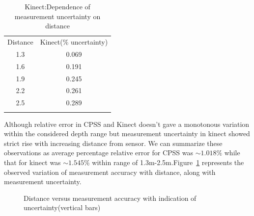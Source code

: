 \begin{table}[ht]
\centering
\begin{tabular}{c c }
\hline\noalign{\smallskip}
Distance   & Kinect(\% uncertainty) \\
\noalign{\smallskip}\hline\noalign{\smallskip}
1.3    & 0.069 \\
1.6    & 0.191 \\
1.9    & 0.245 \\
2.2    & 0.261 \\
2.5    & 0.289 \\
\noalign{\smallskip}\hline
\end{tabular}
\caption{Kinect:Dependence of measurement uncertainty on distance}
\end{table}

\noindent
Although relative error in CPSS and Kinect doesn't gave a monotonous variation within the considered depth range but measurement uncertainty in kinect showed strict rise with increasing  distance from sensor. We can summarize these observations as average percentage relative error for CPSS was $\sim1.018\%$ while that for kinect was $\sim1.545\%$ within range of 1.3m-2.5m.Figure~\ref{fig:dist_vs_accuracy} represents the observed variation of measurement accuracy with distance, along with measurement uncertainty.

\begin{figure}[ht]
\centering
{}
\caption{Distance versus measurement accuracy with indication of uncertainty(vertical bars)}
\label{fig:dist_vs_accuracy}
\end{figure}






